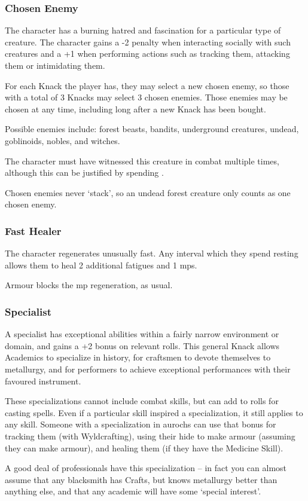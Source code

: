 \begin{multicols}{2}

\subsubsection{Chosen Enemy}

The character has a burning hatred and fascination for a particular type of creature.
The character gains a -2 penalty when interacting socially with such creatures and a +1 when performing actions such as tracking them, attacking them or intimidating them.

For each Knack the player has, they may select a new chosen enemy, so those with a total of 3 Knacks may select 3 chosen enemies. Those enemies may be chosen at any time, including long after a new Knack has been bought.

Possible enemies include: forest beasts, bandits, underground creatures, undead, goblinoids, nobles, and witches.

The character must have witnessed this creature in combat multiple times, although this can be justified by spending .

Chosen enemies never `stack', so an undead forest creature only counts as one chosen enemy.

\subsubsection{Fast Healer}

The character regenerates unusually fast.
Any \gls{interval} which they spend resting allows them to heal 2 additional \glspl{fatigue} and 1 \glspl{mp}.

Armour blocks the \gls{mp} regeneration, as usual.

\subsubsection{Specialist}
\label{specialist}

A specialist has exceptional abilities within a fairly narrow environment or domain, and gains a +2 bonus on relevant rolls.
This general Knack allows Academics to specialize in history, for craftsmen to devote themselves to metallurgy, and for performers to achieve exceptional performances with their favoured instrument.

These specializations cannot include combat skills, but can add to rolls for casting spells.
Even if a particular skill inspired a specialization, it still applies to any skill.
Someone with a specialization in aurochs can use that bonus for tracking them (with Wyldcrafting), using their hide to make armour (assuming they can make armour), and healing them (if they have the Medicine Skill).

A good deal of professionals have this specialization -- in fact you can almost assume that any blacksmith has Crafts, but knows metallurgy better than anything else, and that any academic will have some `special interest'.

\end{multicols}
